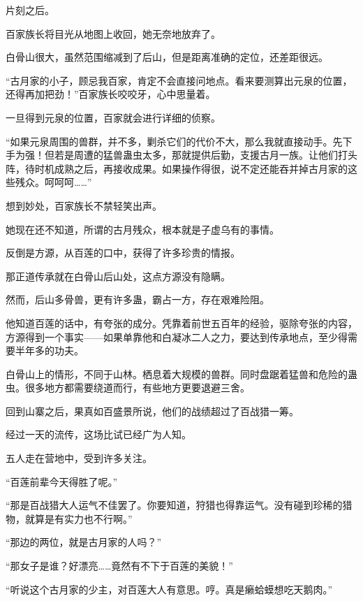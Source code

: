 
\begin{this_body}



片刻之后。

百家族长将目光从地图上收回，她无奈地放弃了。

白骨山很大，虽然范围缩减到了后山，但是距离准确的定位，还差距很远。

“古月家的小子，顾忌我百家，肯定不会直接问地点。看来要测算出元泉的位置，还得再加把劲！”百家族长咬咬牙，心中思量着。

一旦得到元泉的位置，百家就会进行详细的侦察。

“如果元泉周围的兽群，并不多，剿杀它们的代价不大，那么我就直接动手。先下手为强！但若是周遭的猛兽蛊虫太多，那就提供后勤，支援古月一族。让他们打头阵，待时机成熟之后，再接收成果。如果操作得很，说不定还能吞并掉古月家的这些残众。呵呵呵……”

想到妙处，百家族长不禁轻笑出声。

她现在还不知道，所谓的古月残众，根本就是子虚乌有的事情。

反倒是方源，从百莲的口中，获得了许多珍贵的情报。

那正道传承就在白骨山后山处，这点方源没有隐瞒。

然而，后山多骨兽，更有许多蛊，霸占一方，存在艰难险阻。

他知道百莲的话中，有夸张的成分。凭靠着前世五百年的经验，驱除夸张的内容，方源得到一个事实——如果单靠他和白凝冰二人之力，要达到传承地点，至少得需要半年多的功夫。

白骨山上的情形，不同于山林。栖息着大规模的兽群。同时盘踞着猛兽和危险的蛊虫。很多地方都需要绕道而行，有些地方更要退避三舍。

回到山寨之后，果真如百盛景所说，他们的战绩超过了百战猎一筹。

经过一天的流传，这场比试已经广为人知。

五人走在营地中，受到许多关注。

“百莲前辈今天得胜了呢。”

“那是百战猎大人运气不佳罢了。你要知道，狩猎也得靠运气。没有碰到珍稀的猎物，就算是有实力也不行啊。”

“那边的两位，就是古月家的人吗？”

“那女子是谁？好漂亮……竟然有不下于百莲的美貌！”

“听说这个古月家的少主，对百莲大人有意思。哼。真是癞蛤蟆想吃天鹅肉。”


\end{this_body}
